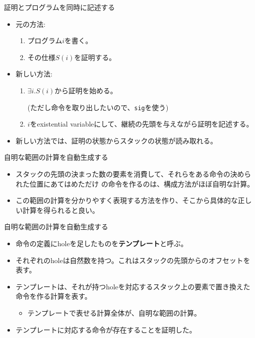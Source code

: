\documentclass[cjk, 12pt]{beamer}
\begin{document}
\begin{frame}{証明とプログラムを同時に記述する}

 \begin{itemize}
  \item 元の方法:
	\begin{enumerate}
	 \item プログラム$i$を書く。
	 \item その仕様$S(i)$を証明する。
	\end{enumerate}
  \item 新しい方法:
	\begin{enumerate}
	 \item $\exists i. S(i)$から証明を始める。

	       (ただし命令を取り出したいので、\texttt{sig}を使う)
	 \item $i$をexistential variableにして、継続の先頭を与えながら証明を記述する。
	\end{enumerate}
  \item 新しい方法では、証明の状態からスタックの状態が読み取れる。
 \end{itemize}

\end{frame}

\begin{frame}{自明な範囲の計算を自動生成する}

 \begin{itemize}
  \item スタックの先頭の決まった数の要素を消費して、それらをある命令の決められた位置にあてはめただけ
	の命令を作るのは、構成方法がほぼ自明な計算。
  \item この範囲の計算を分かりやすく表現する方法を作り、そこから具体的な正しい計算を得られると良い。
 \end{itemize}

\end{frame}

\begin{frame}{自明な範囲の計算を自動生成する}

 \begin{itemize}
  \item 命令の定義にholeを足したものを\textbf{テンプレート}と呼ぶ。
  \item それぞれのholeは自然数を持つ。これはスタックの先頭からのオフセットを表す。
  \item テンプレートは、それが持つholeを対応するスタック上の要素で置き換えた命令を作る計算を表す。
	\begin{itemize}
	 \item テンプレートで表せる計算全体が、自明な範囲の計算。
	\end{itemize}
  \item テンプレートに対応する命令が存在することを証明した。
 \end{itemize}

\end{frame}
\end{document}
